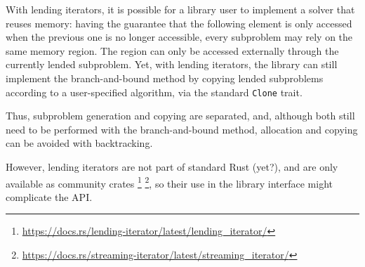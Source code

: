 With lending iterators, it is possible for a library user to implement a solver that
reuses memory: having the guarantee that the following element is only accessed when
the previous one is no longer accessible, every subproblem may rely on the same memory
region. The region can only be accessed externally through the currently lended subproblem.
Yet, with lending iterators, the library can still implement the branch-and-bound method
by copying lended subproblems according to a user-specified algorithm, via the standard
\texttt{Clone} trait.

Thus, subproblem generation and copying are separated, and, although both still need to be
performed with the branch-and-bound method, allocation and copying can be avoided with
backtracking.

However, lending iterators are not part of standard Rust (yet?), and are only available as
community crates
\footnote{\url{https://docs.rs/lending-iterator/latest/lending_iterator/}}
\footnote{\url{https://docs.rs/streaming-iterator/latest/streaming_iterator/}},
so their use in the library interface might complicate the API.
